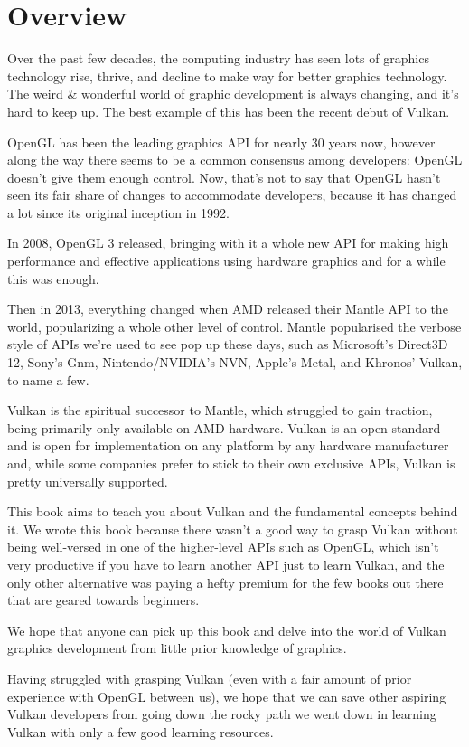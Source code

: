 \section{\textsf{Overview}}\label{overview}

Over the past few decades, the computing industry has seen lots of
graphics technology rise, thrive, and decline to make way for better graphics technology. The weird \& wonderful world of graphic development is always changing, and it's hard to keep up. The best example of this has been the recent debut of Vulkan.

OpenGL has been the leading graphics API for nearly 30 years now,
however along the way there seems to be a common consensus among
developers: OpenGL doesn't give them enough control. Now, that's not to say that OpenGL hasn't seen its fair share of changes to accommodate developers, because it has changed a lot since its original inception in 1992.

In 2008, OpenGL 3 released, bringing with it a whole new API for making high performance and effective applications using hardware graphics and for a while this was enough.

Then in 2013, everything changed when AMD released their Mantle API to the world, popularizing a whole other level of control. Mantle popularised the verbose style of APIs we're used to see pop up these days, such as Microsoft's Direct3D 12, Sony's Gnm, Nintendo/NVIDIA's NVN, Apple's Metal, and Khronos' Vulkan, to name a few.

Vulkan is the spiritual successor to Mantle, which struggled to gain traction, being primarily only available on AMD hardware. Vulkan is an open standard and is open for implementation on any platform by any hardware manufacturer and, while some companies prefer to stick to their own exclusive APIs, Vulkan is pretty universally supported.

This book aims to teach you about Vulkan and the fundamental concepts behind it. We wrote this book because there wasn't a good way to grasp Vulkan without being well-versed in one of the higher-level APIs such as OpenGL, which isn't very productive if you have to learn another API just to learn Vulkan, and the only other alternative was paying a hefty premium for the few books out there that are geared towards beginners.

We hope that anyone can pick up this book and delve into the world of Vulkan graphics development from little prior knowledge of graphics.

Having struggled with grasping Vulkan (even with a fair amount of prior experience with OpenGL between us), we hope that we can save other aspiring Vulkan developers from going down the rocky path we went down in learning Vulkan with only a few good learning resources.
